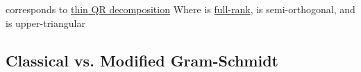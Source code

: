\begin{itemize}
            \begin{itemize}

                  \vItem
                        corresponds to \underline{thin QR decomposition}
                  \vItem
                        Where  is \underline{full-rank},
                         is semi-orthogonal,
                        and  is upper-triangular
            \end{itemize}
\end{itemize}

\subsection*{Classical vs. Modified Gram-Schmidt}

